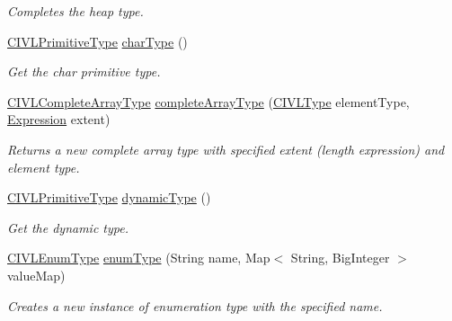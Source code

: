 \begin{DoxyCompactItemize}
\begin{DoxyCompactList}\small\item\em Completes the heap type. \end{DoxyCompactList}\item 
\hyperlink{interfaceedu_1_1udel_1_1cis_1_1vsl_1_1civl_1_1model_1_1IF_1_1type_1_1CIVLPrimitiveType}{C\+I\+V\+L\+Primitive\+Type} \hyperlink{classedu_1_1udel_1_1cis_1_1vsl_1_1civl_1_1model_1_1common_1_1CommonCIVLTypeFactory_a6a1c0040aa0843c4591adf96884cef1a}{char\+Type} ()
\begin{DoxyCompactList}\small\item\em Get the char primitive type. \end{DoxyCompactList}\item 
\hyperlink{interfaceedu_1_1udel_1_1cis_1_1vsl_1_1civl_1_1model_1_1IF_1_1type_1_1CIVLCompleteArrayType}{C\+I\+V\+L\+Complete\+Array\+Type} \hyperlink{classedu_1_1udel_1_1cis_1_1vsl_1_1civl_1_1model_1_1common_1_1CommonCIVLTypeFactory_a5346ed597ca905bf22bcc1e4f077d3a4}{complete\+Array\+Type} (\hyperlink{interfaceedu_1_1udel_1_1cis_1_1vsl_1_1civl_1_1model_1_1IF_1_1type_1_1CIVLType}{C\+I\+V\+L\+Type} element\+Type, \hyperlink{interfaceedu_1_1udel_1_1cis_1_1vsl_1_1civl_1_1model_1_1IF_1_1expression_1_1Expression}{Expression} extent)
\begin{DoxyCompactList}\small\item\em Returns a new complete array type with specified extent (length expression) and element type. \end{DoxyCompactList}\item 
\hyperlink{interfaceedu_1_1udel_1_1cis_1_1vsl_1_1civl_1_1model_1_1IF_1_1type_1_1CIVLPrimitiveType}{C\+I\+V\+L\+Primitive\+Type} \hyperlink{classedu_1_1udel_1_1cis_1_1vsl_1_1civl_1_1model_1_1common_1_1CommonCIVLTypeFactory_a3073361222b38e87518e6aa9e05057b2}{dynamic\+Type} ()
\begin{DoxyCompactList}\small\item\em Get the dynamic type. \end{DoxyCompactList}\item 
\hyperlink{interfaceedu_1_1udel_1_1cis_1_1vsl_1_1civl_1_1model_1_1IF_1_1type_1_1CIVLEnumType}{C\+I\+V\+L\+Enum\+Type} \hyperlink{classedu_1_1udel_1_1cis_1_1vsl_1_1civl_1_1model_1_1common_1_1CommonCIVLTypeFactory_a0d9fcb3f4ae987b6ac6b55549ecee191}{enum\+Type} (String name, Map$<$ String, Big\+Integer $>$ value\+Map)
\begin{DoxyCompactList}\small\item\em Creates a new instance of enumeration type with the specified name. \end{DoxyCompactList}\item 

\end{DoxyCompactItemize}
